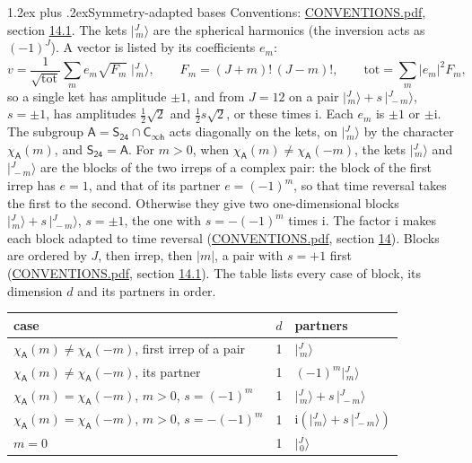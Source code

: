 \documentclass[10pt,a4paper]{article}
\makeatletter
\renewcommand\section{\@startsection{section}{1}{\z@}{-3ex plus -1ex minus -.2ex}%
  {1.2ex plus .2ex}{\normalfont\large\sffamily\bfseries\color{parttitle}}}
\numberwithin{equation}{section}
\newcommand{\grp}[1]{\mathsf{#1}}
\newcommand{\iunit}{\mathrm{i}}
\newcommand{\chiA}{\chi_{\grp{A}}}
\newcommand{\jm}[2]{\bigl\lvert{}^{#1}_{\,#2}\bigr\rangle}
\makeatother
\begin{document}
\section{Symmetry-adapted bases}\label{s:bases}
Conventions: \href{../../CONVENTIONS.pdf}{CONVENTIONS.pdf}, section \href{../../CONVENTIONS.pdf\#conv.14.1}{14.1}.
\leavevmode\label{n:index.m}\label{n:vector.ket}The kets $\jm{J}{m}$ are the spherical harmonics (the inversion acts as $(-1)^J$). \label{n:index.ketcoefficient}\label{n:vector.basis.symmetry}\label{n:index.ketweight}\label{n:index.total}A vector is listed by its coefficients $e_m$:
\begin{equation}\label{e:ket}v = \frac{1}{\sqrt{\mathrm{tot}}}\sum_m e_m\sqrt{F_m}\;\jm{J}{m},\qquad F_m = (J+m)!\,(J-m)!,\qquad \mathrm{tot} = \sum_m |e_m|^2F_m,\end{equation}
\leavevmode\label{n:index.pair.sign}so a single ket has amplitude $\pm1$, and from $J = 12$ on a pair $\jm{J}{m} + s\,\jm{J}{-m}$, $s = \pm1$, has amplitudes $\tfrac{1}{2}\sqrt{2}$ and $\tfrac{1}{2}s\sqrt{2}$, or these times $\iunit$. Each $e_m$ is $\pm1$ or $\pm\iunit$.
\leavevmode\label{n:group.A}\label{n:function.character.abelian}The subgroup $\grp{A} = \grp{S_{24}}\cap\grp{C_{\infty h}}$ acts diagonally on the kets, on $\jm{J}{m}$ by the character $\chiA(m)$, and $\grp{S_{24}} = \grp{A}$. For $m > 0$, when $\chiA(m) \ne \chiA(-m)$, the kets $\jm{J}{m}$ and $\jm{J}{-m}$ are the blocks of the two irreps of a complex pair: the block of the first irrep has $e = 1$, and that of its partner $e = (-1)^m$, so that time reversal takes the first to the second. Otherwise they give two one-dimensional blocks $\jm{J}{m} + s\,\jm{J}{-m}$, $s = \pm1$, the one with $s = -(-1)^m$ times $\iunit$. The factor $\iunit$ makes each block adapted to time reversal (\href{../../CONVENTIONS.pdf}{CONVENTIONS.pdf}, section \href{../../CONVENTIONS.pdf\#conv.14}{14}). Blocks are ordered by $J$, then irrep, then $|m|$, a pair with $s = +1$ first (\href{../../CONVENTIONS.pdf}{CONVENTIONS.pdf}, section \href{../../CONVENTIONS.pdf\#conv.14.1}{14.1}).
\leavevmode\label{n:head.case}\label{n:head.partners}The table lists every case of block, its dimension $d$ and its partners in order.
\begin{center}\begin{tabular}{@{}lrl@{}}\toprule
case & $d$ & partners\\\midrule
$\chiA(m) \ne \chiA(-m)$, first irrep of a pair & 1 & $\jm{J}{m}$\\
$\chiA(m) \ne \chiA(-m)$, its partner & 1 & $(-1)^m\jm{J}{m}$\\
$\chiA(m) = \chiA(-m)$, $m > 0$, $s = (-1)^m$ & 1 & $\jm{J}{m} + s\,\jm{J}{-m}$\\
$\chiA(m) = \chiA(-m)$, $m > 0$, $s = -(-1)^m$ & 1 & $\iunit(\jm{J}{m} + s\,\jm{J}{-m})$\\
$m = 0$ & 1 & $\jm{J}{0}$\\
\bottomrule\end{tabular}\end{center}
\end{document}
